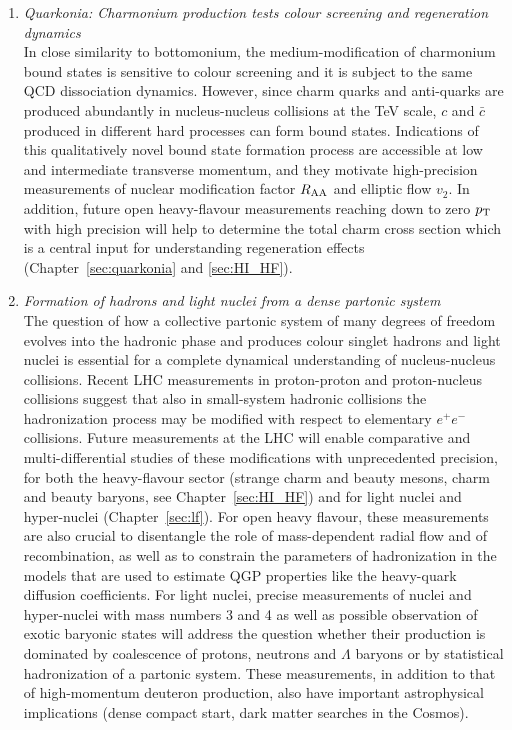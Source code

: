 \documentclass[../report.tex]{subfiles}
\begin{document}
\begin{enumerate}
\item {\it Quarkonia: Charmonium production tests colour screening and regeneration dynamics}\\ In close similarity to bottomonium, the medium-modification of charmonium bound states is sensitive to colour screening and it is subject to the same QCD dissociation dynamics. However, since charm quarks and anti-quarks are produced abundantly in nucleus-nucleus collisions at the TeV scale, $c$ and $\bar c$ produced in different hard processes can form bound states. Indications of this qualitatively novel bound state formation process are accessible at low and intermediate transverse momentum, and they motivate high-precision measurements of nuclear modification factor $R_{\rm AA}$ and elliptic flow $v_2$. In addition, future open heavy-flavour measurements reaching down to zero $p\sb{\scriptstyle\mathrm{T}}$ with high precision will help to determine the total charm cross section which is a central input for understanding regeneration effects (Chapter~\ref{sec:quarkonia} and \ref{sec:HI_HF}). 
\item {\it Formation of hadrons and light nuclei from a dense partonic system}\\ The question of how a collective partonic system of many degrees of freedom evolves into the hadronic phase and produces colour singlet hadrons and light nuclei is essential for a complete dynamical understanding of nucleus-nucleus collisions. Recent LHC measurements in proton-proton and proton-nucleus collisions suggest that also in small-system hadronic collisions the hadronization process may be modified with respect to elementary $e^+e^-$ collisions. 
Future measurements at the LHC will enable comparative and multi-differential studies of these modifications with unprecedented precision, for both the heavy-flavour sector (strange charm and beauty mesons, charm and beauty baryons, see Chapter~\ref{sec:HI_HF}) and for light nuclei and hyper-nuclei (Chapter~\ref{sec:lf}). For open heavy flavour, these measurements are also crucial to disentangle the role of mass-dependent radial flow and of recombination, as well as to constrain the parameters of hadronization in the models that are used to estimate QGP properties like the heavy-quark diffusion coefficients. For light nuclei, precise measurements of nuclei and hyper-nuclei with mass numbers 3 and 4 as well as possible observation of exotic baryonic states will address the question whether their production is dominated by coalescence of protons, neutrons and $\Lambda$ baryons or by statistical hadronization of a partonic system. These measurements, in addition to that of high-momentum deuteron production, also have important astrophysical implications (dense compact start, dark matter searches in the Cosmos).
\end{enumerate}
\end{document}
